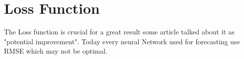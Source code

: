 \chapter{Loss Function}

The Loss function is crucial for a great result some article talked about it as "potential improvement". Today every neural Network used for forecasting use RMSE which may not be optimal. 